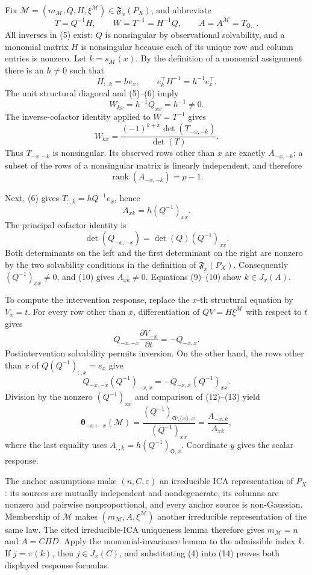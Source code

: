 Fix \(\mathcal M=(m_{\mathcal M},Q,H,\xi^{\mathcal M})\in\mathfrak F_x(P_X)\), and abbreviate
\[
 T=Q^{-1}H,
 \qquad W=T^{-1}=H^{-1}Q,
 \qquad A=A^{\mathcal M}=T_{\mathsf O,:}. \tag{5}
\]
All inverses in (5) exist: \(Q\) is nonsingular by observational solvability, and a monomial matrix \(H\) is nonsingular because each of its unique row and column entries is nonzero. Let \(k=s_{\mathcal M}(x)\). By the definition of a monomial assignment there is an \(h\ne0\) such that
\[
 H_{:,k}=h e_x,
 \qquad e_k^\top H^{-1}=h^{-1}e_x^\top. \tag{6}
\]
The unit structural diagonal and (5)--(6) imply
\[
 W_{kx}=h^{-1}Q_{xx}=h^{-1}\ne0. \tag{7}
\]
The inverse-cofactor identity applied to \(W=T^{-1}\) gives
\[
 W_{kx}=\frac{(-1)^{k+x}\det(T_{-x,-k})}{\det(T)}. \tag{8}
\]
Thus \(T_{-x,-k}\) is nonsingular. Its observed rows other than \(x\) are exactly \(A_{-x,-k}\); a subset of the rows of a nonsingular matrix is linearly independent, and therefore
\[
 \operatorname{rank}(A_{-x,-k})=p-1. \tag{9}
\]

Next, (6) gives \(T_{:,k}=hQ^{-1}e_x\), hence
\[
 A_{xk}=h(Q^{-1})_{xx}. \tag{10}
\]
The principal cofactor identity is
\[
 \det(Q_{-x,-x})=\det(Q)(Q^{-1})_{xx}. \tag{11}
\]
Both determinants on the left and the first determinant on the right are nonzero by the two solvability conditions in the definition of \(\mathfrak F_x(P_X)\). Consequently \((Q^{-1})_{xx}\ne0\), and (10) gives \(A_{xk}\ne0\). Equations (9)--(10) show \(k\in J_x(A)\).

To compute the intervention response, replace the \(x\)-th structural equation by \(V_x=t\). For every row other than \(x\), differentiation of \(QV=H\xi^{\mathcal M}\) with respect to \(t\) gives
\[
 Q_{-x,-x}\frac{\partial V_{-x}}{\partial t}=-Q_{-x,x}. \tag{12}
\]
Postintervention solvability permits inversion. On the other hand, the rows other than \(x\) of \(Q(Q^{-1})_{:,x}=e_x\) give
\[
 Q_{-x,-x}(Q^{-1})_{-x,x}=-Q_{-x,x}(Q^{-1})_{xx}. \tag{13}
\]
Division by the nonzero \((Q^{-1})_{xx}\) and comparison of (12)--(13) yield
\[
 \boldsymbol\theta_{-x\leftarrow x}(\mathcal M)
 =\frac{(Q^{-1})_{\mathsf O\setminus\{x\},x}}{(Q^{-1})_{xx}}
 =\frac{A_{-x,k}}{A_{xk}}, \tag{14}
\]
where the last equality uses \(A_{:,k}=h(Q^{-1})_{\mathsf O,x}\). Coordinate \(y\) gives the scalar response.

The anchor assumptions make \((n,C,\varepsilon)\) an irreducible ICA representation of \(P_X\): its sources are mutually independent and nondegenerate, its columns are nonzero and pairwise nonproportional, and every anchor source is non-Gaussian. Membership of \(\mathcal M\) makes \((m_{\mathcal M},A,\xi^{\mathcal M})\) another irreducible representation of the same law. The cited irreducible-ICA uniqueness lemma therefore gives \(m_{\mathcal M}=n\) and \(A=C\Pi D\). Apply the monomial-invariance lemma to the admissible index \(k\). If \(j=\pi(k)\), then \(j\in J_x(C)\), and substituting (4) into (14) proves both displayed response formulas.
